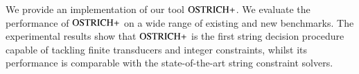 We provide an implementation of our tool $\text{OSTRICH+}$.
We evaluate the performance of $\text{OSTRICH+}$ on  a wide range of existing and new 
benchmarks. The experimental results show that $\text{OSTRICH+}$ is the first string 
decision procedure capable of tackling finite transducers and integer constraints, whilst
its performance is comparable with the state-of-the-art string constraint solvers.
